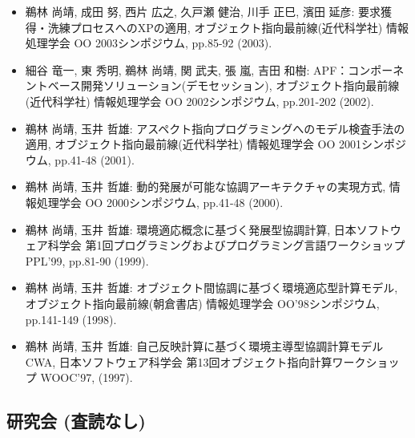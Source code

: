 \documentclass{jarticle}
\begin{document}
\begin{itemize}
\item 鵜林 尚靖, 成田 努, 西片 広之, 久戸瀬 健治, 川手 正巳, 濱田 延彦:
要求獲得・洗練プロセスへのXPの適用,
オブジェクト指向最前線(近代科学社) 情報処理学会 OO 2003シンポジウム,
pp.85-92 (2003).

\item 細谷 竜一, 東 秀明, 鵜林 尚靖, 関 武夫, 張 嵐, 吉田 和樹:
APF：コンポーネントベース開発ソリューション(デモセッション),
オブジェクト指向最前線(近代科学社) 情報処理学会 OO 2002シンポジウム,
pp.201-202 (2002).

\item 鵜林 尚靖, 玉井 哲雄:
アスペクト指向プログラミングへのモデル検査手法の適用,
オブジェクト指向最前線(近代科学社) 情報処理学会 OO 2001シンポジウム,
pp.41-48 (2001).

\item 鵜林 尚靖, 玉井 哲雄:
動的発展が可能な協調アーキテクチャの実現方式,
情報処理学会 OO 2000シンポジウム,
pp.41-48 (2000).

\item 鵜林 尚靖, 玉井 哲雄:
環境適応概念に基づく発展型協調計算,
日本ソフトウェア科学会 第1回プログラミングおよびプログラミング言語ワークショップ PPL'99,
pp.81-90 (1999).

\item 鵜林 尚靖, 玉井 哲雄:
オブジェクト間協調に基づく環境適応型計算モデル,
オブジェクト指向最前線(朝倉書店) 情報処理学会 OO'98シンポジウム,
pp.141-149 (1998).

\item 鵜林 尚靖, 玉井 哲雄:
自己反映計算に基づく環境主導型協調計算モデルCWA,
日本ソフトウェア科学会
第13回オブジェクト指向計算ワークショップ WOOC'97,
(1997).
\end{itemize}


\subsection{研究会 (査読なし)}
\end{document}
